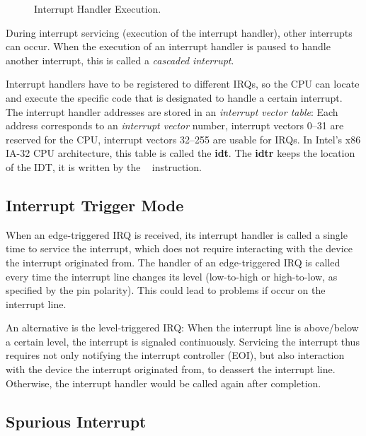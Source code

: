 \begin{figure}[h]
    \centering
    \begin{subfigure}[b]{0.5\textwidth}
        
    \end{subfigure}
    \caption{Interrupt Handler Execution.}
    \label{fig:interruptexecution}
\end{figure}

During interrupt servicing (execution of the interrupt handler), other interrupts can occur.
When the execution of an interrupt handler is paused to handle another interrupt, this is called a \textit{cascaded interrupt}.

Interrupt handlers have to be registered to different IRQs, so the CPU can locate and execute the specific code that is designated to handle a certain interrupt.
The interrupt handler addresses are stored in an \textit{interrupt vector table}: Each address corresponds to an \textit{interrupt vector} number, interrupt vectors 0--31 are reserved for the CPU, interrupt vectors 32--255 are usable for IRQs.
In Intel's x86 IA-32 CPU architecture, this table is called the \textbf{\gls{idt}}.
The \textbf{\gls{idtr}} keeps the location of the IDT, it is written by the ~\autocite{x86isa} instruction.

\subsection{Interrupt Trigger Mode}
\label{subsec:triggermode}

When an edge-triggered IRQ is received, its interrupt handler is called a single time to service the interrupt, which does not require interacting with the device the interrupt originated from.
The handler of an edge-triggered IRQ is called every time the interrupt line changes its level (low-to-high or high-to-low, as specified by the pin polarity).
This could lead to problems if  occur on the interrupt line.

An alternative is the level-triggered IRQ\@: When the interrupt line is above/below a certain level, the interrupt is signaled continuously.
Servicing the interrupt thus requires not only notifying the interrupt controller (EOI), but also interaction with the device the interrupt originated from, to deassert the interrupt line.
Otherwise, the interrupt handler would be called again after completion.

\subsection{Spurious Interrupt}
\label{subsec:spurious}

